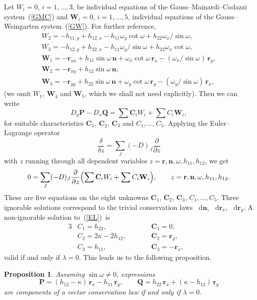 \documentclass[pdftex]{sigma}
\let\ve\mathbf
\def\h#1#2{h_{#1#2}}
\def\f{\omega}
\def\k{\kappa}
\def\l{\lambda}
\def\eqref#1{{\rm(\ref{#1})}}
\newtheorem{Proposition}[Theorem]{Proposition}
 { \theoremstyle{definition}
\newtheorem{construction}[Theorem]{Construction}
\newtheorem{Definition}[Theorem]{Definition}
\newtheorem{Example}[Theorem]{Example}
\newtheorem{Remark}[Theorem]{Remark} }
\numberwithin{equation}{section}
\def\dif{\mathop{}\!\mathrm d}
\begin{document}
Let $W_i = 0$, $i = 1, \dots, 3$, be individual equations of the
Gauss--Mainardi--Codazzi system~\eqref{GMC} and
$\ve W_i = 0$, $i = 1, \dots, 5$,
individual equations of the Gauss--Weingarten system~\eqref{GW}.
For further reference,
\begin{gather*}
W_2 = -\h{11}{,y} + \h{12}{,x} - \h11 \f_y \cot\f + \h22 \f_x/{\sin\f}, \\
W_3 = -\h{12}{,y} + \h{22}{,x} - \h11 \f_y/{\sin\f} + \h22 \f_x \cot\f, \\
\ve W_1 = -\ve r_{xx} + \h11 \sin\f\,\ve n +  \f_x\cot\f\,\ve r_x - (\f_x/\sin\f)\,\ve r_y, \\
\ve W_2 = -\ve r_{xy} + \h12\sin\f\,\ve n, \\
\ve W_3 = -\ve r_{yy} + \h22\sin\f\,\ve n + \f_y \cot\f\,\ve r_y
 - (\f_y/\sin\f)\,\ve r_x,
\end{gather*}
(we omit $W_1$, $\ve W_4$ and $\ve W_5$, which we shall not need explicitly).
Then we can write
\[
D_y \ve P - D_x \ve Q = \sum \ve C_i W_i + \sum C_i \ve W_i,
\]
for suitable characteristics $\ve C_1$, $\ve C_2$, $\ve C_3$ and $C_1, \dots, C_5$.
Applying the Euler--Lagrange operator
\[
\frac{\delta}{\delta z} = \sum_J (-D)_J \frac{\partial}{\partial z}
\]
with $z$ running through all
dependent variables $z = \ve r, \ve n, \f, \h11, \h12$, we get
\begin{gather}\label{EL}
0 = \sum_J (-D)_J \frac{\partial}{\partial z}
   \Bigl(\sum \ve C_i W_i + \sum C_i \ve W_i\Bigr),
 \qquad z = \ve r, \ve n, \f, \h11, \h12.
\end{gather}
These are five equations on the eight unknowns
$\ve C_1$, $\ve C_2$, $\ve C_3$, $C_1, \dots, C_5$.
Three ignorable solutions correspond to the trivial conservation laws
$\dif\ve n$,
$\dif\ve r_x$,
$\dif\ve r_y$.
A non-ignorable solution to~\eqref{EL}~is
\begin{alignat*}{3}
&C_1 = \h22, \qquad &&       \ve C_1 = 0,& \\
&C_2 = 2\k - 2\h12, \qquad && \ve C_2 = \ve r_y, &\\
&C_3 = \h11, \qquad && \ve C_3 = -\ve r_x,&
\end{alignat*}
valid if and only if $\l = 0$.
This leads us to the following proposition.

\begin{Proposition}\label{prop:vcl}
Assuming $\sin\f \ne 0$, expressions
\[
\ve P = (\h12 - \k)\,\ve r_x - \h11\,\ve r_y, \qquad
\ve Q = \h22\,\ve r_x + (\k - \h12)\,\ve r_y
\]
 are components of a vector conservation law if and only if $\l = 0$.
\end{Proposition}
\end{document}
